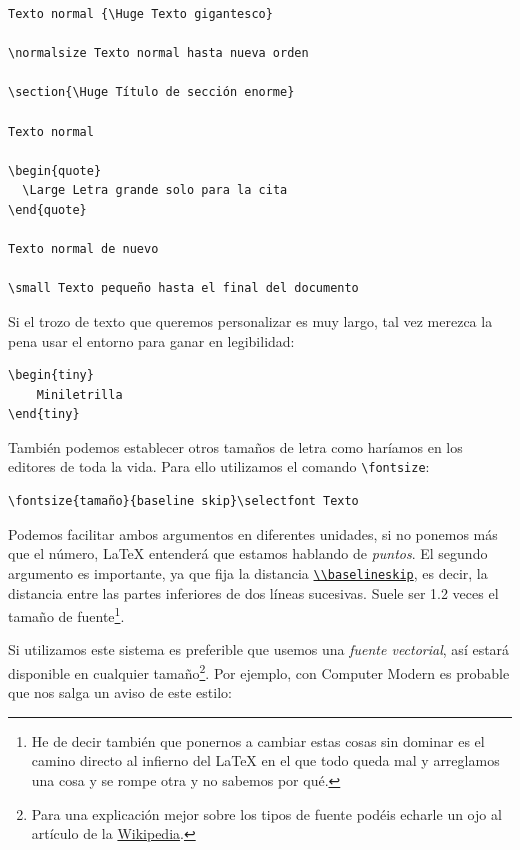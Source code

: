 \begin{lstlisting}[language={[latex]tex}]
Texto normal {\Huge Texto gigantesco}

\normalsize Texto normal hasta nueva orden

\section{\Huge Título de sección enorme}

Texto normal

\begin{quote}
  \Large Letra grande solo para la cita
\end{quote}

Texto normal de nuevo

\small Texto pequeño hasta el final del documento
\end{lstlisting}

Si el trozo de texto que queremos personalizar es muy largo, tal vez
merezca la pena usar el entorno para ganar en legibilidad:

\begin{lstlisting}[language={[latex]tex}]
\begin{tiny}
    Miniletrilla 
\end{tiny}
\end{lstlisting}

También podemos establecer otros tamaños de letra como haríamos en los
editores de toda la vida. Para ello utilizamos el comando
\lstinline!\fontsize!:

\begin{lstlisting}[language={[latex]tex}]
\fontsize{tamaño}{baseline skip}\selectfont Texto
\end{lstlisting}

Podemos facilitar ambos argumentos en diferentes unidades, si no ponemos
más que el número, LaTeX entenderá que estamos hablando de
\emph{puntos}. El segundo argumento es importante, ya que fija la
distancia
\href{http://noodle.med.yale.edu/latex/latex2e-html/baselineskip.html}{\lstinline!\\baselineskip!},
es decir, la distancia entre las partes inferiores de dos líneas
sucesivas. Suele ser 1.2 veces el tamaño de fuente\footnote{He de decir
  también que ponernos a cambiar estas cosas sin dominar es el camino
  directo al infierno del LaTeX en el que todo queda mal y arreglamos
  una cosa y se rompe otra y no sabemos por qué.}.

Si utilizamos este sistema es preferible que usemos una \emph{fuente
vectorial}, así estará disponible en cualquier tamaño\footnote{Para una
  explicación mejor sobre los tipos de fuente podéis echarle un ojo al
  artículo de la
  \href{https://en.wikipedia.org/wiki/Computer_font}{Wikipedia}.}. Por
ejemplo, con Computer Modern es probable que nos salga un aviso de este
estilo:


